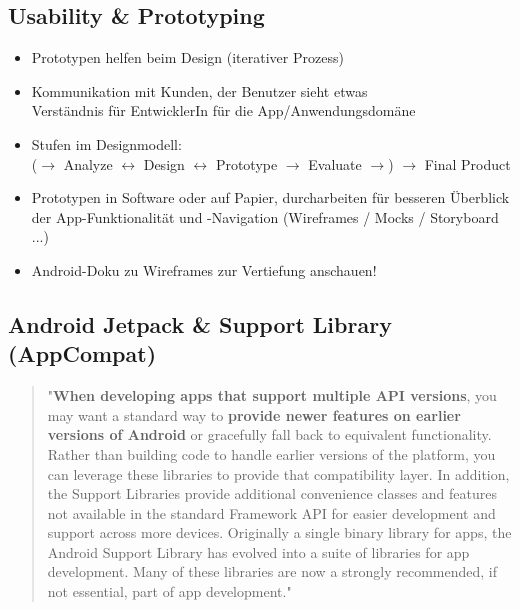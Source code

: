 \documentclass[a4paper]{article}
\begin{document}
	\subsection{Usability \& Prototyping}
	
	\begin{itemize}
		
		\item Prototypen helfen beim Design (iterativer Prozess)
		
		\item Kommunikation mit Kunden, der Benutzer sieht etwas\\
		Verständnis für EntwicklerIn für die App/Anwendungsdomäne
		
		\item Stufen im Designmodell:\\
		($\rightarrow$ Analyze $\leftrightarrow$ Design $\leftrightarrow$ Prototype $\rightarrow$ Evaluate $\rightarrow$) $\rightarrow$ Final Product
		
		\item Prototypen in Software oder auf Papier, durcharbeiten für besseren Überblick der App-Funktionalität und -Navigation (Wireframes / Mocks / Storyboard ...)
		
		\item Android-Doku zu Wireframes zur Vertiefung anschauen!
		
	\end{itemize}

	\subsection{Android Jetpack \& Support Library (AppCompat)}
	
	\begin{quote}
		"\textbf{When developing apps that support multiple API versions}, you may want a standard way to \textbf{provide newer features on earlier versions of Android} or gracefully fall back to equivalent functionality. Rather than building code to handle earlier versions of the platform, you can leverage these libraries to provide that compatibility layer. In addition, the Support Libraries provide additional convenience classes and features not available in the standard Framework API for easier development and support across more devices. Originally a single binary library for apps, the Android Support Library has evolved into a suite of libraries for app development. Many of these libraries are now a strongly recommended, if not essential, part of app development."
	\end{quote}
\end{document}
